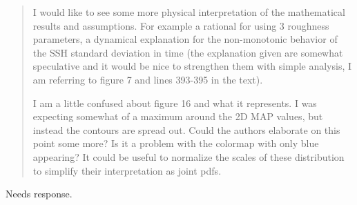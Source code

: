 \documentclass[]{article}
\newcommand{\alert}[1]{{\color{red} #1}}
\begin{document}
\begin{quote}
I would like to see some more physical interpretation of the mathematical results and assumptions. For example a rational for using 3 roughness parameters, a dynamical explanation for the non-monotonic behavior of the SSH standard deviation in time (the explanation given are somewhat speculative and it would be nice to strengthen them with simple analysis, I am referring to figure 7 and lines 393-395 in the text).

I am a little confused about figure 16 and what it represents. I was expecting somewhat of a maximum around the 2D MAP values, but instead the contours are spread out. Could the authors elaborate on this point some more? Is it a problem with the colormap with only blue appearing? It could be useful to normalize the scales of these distribution to simplify their interpretation as joint pdfs.
\end{quote}

\alert{Needs response.} \\
\end{document}
